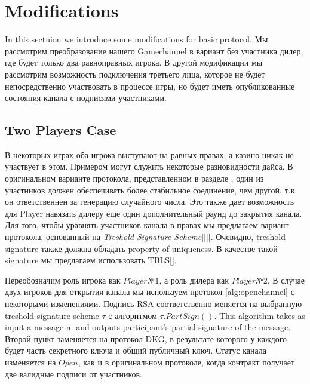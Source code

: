 \section{Modifications}
In this sectuion we introduce some modifications for basic protocol. Мы рассмотрим преобразование нашего Gamechannel в вариант без участника дилер, где будет только два равноправных игрока. В другой модификации мы рассмотрим возможность подключения третьего лица, которое не будет непосредственно участвовать в процессе игры, но будет иметь опубликованные состояния канала с подписями участниками. 
	\subsection{Two Players Case}
В некоторых играх оба игрока выступают на равных правах, а казино никак не участвует в этом. Примером могут служить некоторые разновидности дайса. В оригинальном варианте протокола, представленном  в разделе , один из участников должен обеспечивать более стабильное соединение, чем другой, т.к. он ответственнен за генерацию случайного числа. Это также дает возможность для Player навязать дилеру еще один дополнительный раунд до закрытия канала. Для того, чтобы уравнять участников канала в правах мы предлагаем вариант протокола, основанный на \textit {Treshold Signature Scheme}[][]. Очевидно, treshold signature также должна обладать property of uniqueness. В качестве такой signature мы предлагаем использовать TBLS[].

Переобозначим роль игрока как $Player№1$, а роль дилера как $Player№2$.
В случае двух игроков для открытия канала мы используем протокол \autoref{alg:openchannel} с некоторыми изменениями. Подпись RSA соответственно меняется на выбранную treshold signature scheme $ \tau $ с алгоритмом $\tau .PartSign()$. This algorithm takes as input a message m and outputs participant's partial signature of the message. Второй пункт заменяется на протокол DKG, в результате которого у каждого будет часть секретного ключа и общий публичный ключ. Статус канала изменяется на $Open$, как и в оригинальном протоколе, когда контракт получает две валидные подписи от участников. 


